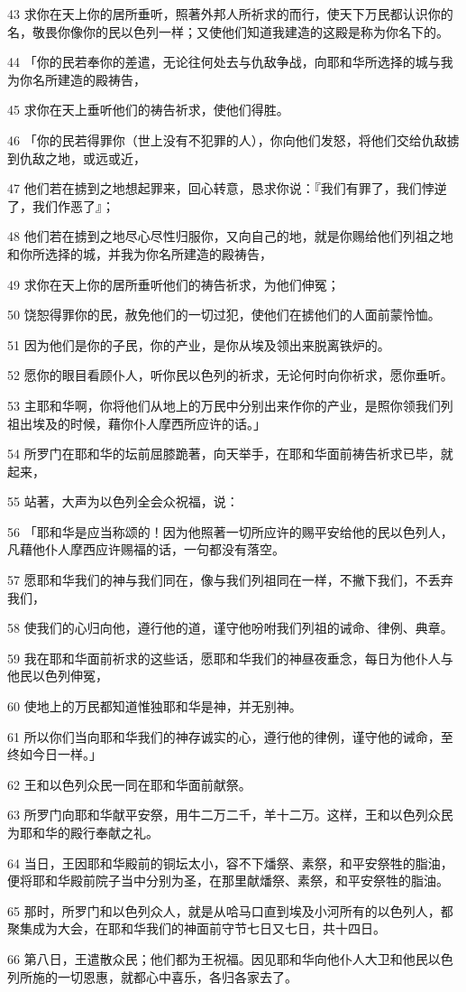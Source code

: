 \par 43 求你在天上你的居所垂听，照著外邦人所祈求的而行，使天下万民都认识你的名，敬畏你像你的民以色列一样；又使他们知道我建造的这殿是称为你名下的。
\par 44 「你的民若奉你的差遣，无论往何处去与仇敌争战，向耶和华所选择的城与我为你名所建造的殿祷告，
\par 45 求你在天上垂听他们的祷告祈求，使他们得胜。
\par 46 「你的民若得罪你（世上没有不犯罪的人），你向他们发怒，将他们交给仇敌掳到仇敌之地，或远或近，
\par 47 他们若在掳到之地想起罪来，回心转意，恳求你说：『我们有罪了，我们悖逆了，我们作恶了』；
\par 48 他们若在掳到之地尽心尽性归服你，又向自己的地，就是你赐给他们列祖之地和你所选择的城，并我为你名所建造的殿祷告，
\par 49 求你在天上你的居所垂听他们的祷告祈求，为他们伸冤；
\par 50 饶恕得罪你的民，赦免他们的一切过犯，使他们在掳他们的人面前蒙怜恤。
\par 51 因为他们是你的子民，你的产业，是你从埃及领出来脱离铁炉的。
\par 52 愿你的眼目看顾仆人，听你民以色列的祈求，无论何时向你祈求，愿你垂听。
\par 53 主耶和华啊，你将他们从地上的万民中分别出来作你的产业，是照你领我们列祖出埃及的时候，藉你仆人摩西所应许的话。」
\par 54 所罗门在耶和华的坛前屈膝跪著，向天举手，在耶和华面前祷告祈求已毕，就起来，
\par 55 站著，大声为以色列全会众祝福，说：
\par 56 「耶和华是应当称颂的！因为他照著一切所应许的赐平安给他的民以色列人，凡藉他仆人摩西应许赐福的话，一句都没有落空。
\par 57 愿耶和华我们的神与我们同在，像与我们列祖同在一样，不撇下我们，不丢弃我们，
\par 58 使我们的心归向他，遵行他的道，谨守他吩咐我们列祖的诫命、律例、典章。
\par 59 我在耶和华面前祈求的这些话，愿耶和华我们的神昼夜垂念，每日为他仆人与他民以色列伸冤，
\par 60 使地上的万民都知道惟独耶和华是神，并无别神。
\par 61 所以你们当向耶和华我们的神存诚实的心，遵行他的律例，谨守他的诫命，至终如今日一样。」
\par 62 王和以色列众民一同在耶和华面前献祭。
\par 63 所罗门向耶和华献平安祭，用牛二万二千，羊十二万。这样，王和以色列众民为耶和华的殿行奉献之礼。
\par 64 当日，王因耶和华殿前的铜坛太小，容不下燔祭、素祭，和平安祭牲的脂油，便将耶和华殿前院子当中分别为圣，在那里献燔祭、素祭，和平安祭牲的脂油。
\par 65 那时，所罗门和以色列众人，就是从哈马口直到埃及小河所有的以色列人，都聚集成为大会，在耶和华我们的神面前守节七日又七日，共十四日。
\par 66 第八日，王遣散众民；他们都为王祝福。因见耶和华向他仆人大卫和他民以色列所施的一切恩惠，就都心中喜乐，各归各家去了。

